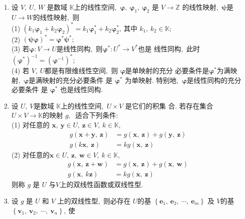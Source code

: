 \begin{enumerate}
		\item 设 $ V,\  U,\  W$  是数域 $ \mathbb{K}  $上的线性空间,\   $\boldsymbol{\varphi},\  \boldsymbol{\varphi}_{1},\  \boldsymbol{\varphi}_{2} $ 是 $ V \rightarrow \mathbb{Z} $ 的线性映射,\   $\boldsymbol{\psi}  $是  $U \rightarrow W  $的线性映射,\  则\\
		(1) $ \left(k_{1} \boldsymbol{\varphi}_{1}+k_{2} \boldsymbol{\varphi}_{2}\right)^{*}=k_{1} \boldsymbol{\varphi}_{1}^{*}+k_{2} \boldsymbol{\varphi}_{2}^{*} ,\  $其中  $k_{1},\  k_{2} \in \mathbb{K} ;$\\
		(2) $ (\boldsymbol{\psi}\boldsymbol{\varphi})^{*}=\boldsymbol{\varphi}^{*} \boldsymbol{\psi}^{*} ;$\\
		(3) 若$ \boldsymbol{\varphi}: V \rightarrow U  $是线性同构,\  则$  \boldsymbol{\varphi}^{*}: U^{*} \rightarrow V^{*}  $也是 线性同构,\  此时 $ \left(\boldsymbol{\varphi}^{*}\right)^{-1}=\left(\boldsymbol{\varphi}^{-1}\right)^{*} ;$\\
		(4) 若 $ V,\  U  $都是有限维线性空间,\  则  $\boldsymbol{\varphi}$是单映射的充分 必要条件是$\boldsymbol{\varphi}^{*}  $为满映射,\   $\boldsymbol{\varphi}$是满映射的充分必要条件 是  $\boldsymbol{\varphi}^{*}$  为单映射. 特别地,\ $\boldsymbol{\varphi}$是线性同构的充分必要条件 是  $\boldsymbol{\varphi}^{*} $ 也是线性同构.
		\item 设 $ U,\  V  $是数域  $\mathbb{K}  $上的线性空间,\ $  U \times V $ 是它们的积集 合. 若存在集合  $U \times V \rightarrow \mathbb{K}  $的映射 $ g ,\ $ 适合下列条件:\\
		(1) 对任意的 $ \boldsymbol{x},\  \boldsymbol{y} \in U,\  \boldsymbol{z} \in V,\  k \in \mathbb{K} ,\ $
		$$\begin{aligned}
			g(\boldsymbol{x}+\boldsymbol{y},\  \boldsymbol{z}) &=g(\boldsymbol{x},\  \boldsymbol{z})+g(\boldsymbol{y},\  \boldsymbol{z}) \\
			g(k \boldsymbol{x},\  \boldsymbol{z}) &=k g(\boldsymbol{x},\  \boldsymbol{z})
		\end{aligned}$$
		(2) 对任意的$  \boldsymbol{x} \in U,\  \boldsymbol{z},\  \boldsymbol{w} \in V,\  k \in \mathbb{K} ,\ $
		$$\begin{aligned}
			g(\boldsymbol{x},\  \boldsymbol{z}+\boldsymbol{w}) &=g(\boldsymbol{x},\  \boldsymbol{z})+g(\boldsymbol{x},\  \boldsymbol{w}) \\
			g(\boldsymbol{x},\  k \boldsymbol{z}) &=k g(\boldsymbol{x},\  \boldsymbol{z})
		\end{aligned}$$
		则称  $g $ 是 $ U$  与$  V  $上的双线性函数或双线性型.
		\item 设 $ g$  是  $U$  和 $ V $ 上的双线性型,\  则必存在 $ U  $的基  $\left\{\boldsymbol{e}_{1},\  \boldsymbol{e}_{2},\  \cdots,\  \boldsymbol{e}_{m}\right\} $ 及 $ V  $的基  $\left\{\boldsymbol{v}_{1},\  \boldsymbol{v}_{2},\  \cdots,\  \boldsymbol{v}_{n}\right\} ,\  $使
		

\end{enumerate}
